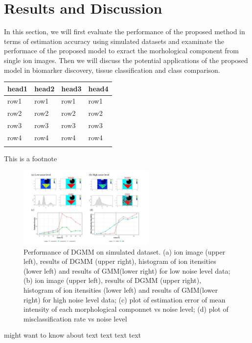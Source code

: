 \documentclass{bioinfo}
\begin{document}
\section{Results and Discussion}
In this section, we will first evaluate the performance of the proposed method in terms of estimation accuracy using simulated datasets and examinate the performace of the proposed model to exract the morhological component from single ion images. Then we will discuss the potential applications of the proposed model in biomarker discovery, tissue classification and class comparison.







\begin{table}[!t]
 {\begin{tabular}{@{}llll@{}}\toprule head1 &
head2 & head3 & head4\\\midrule
row1 & row1 & row1 & row1\\
row2 & row2 & row2 & row2\\
row3 & row3 & row3 & row3\\
row4 & row4 & row4 & row4\\\botrule
\end{tabular}}{This is a footnote}
\end{table}



\begin{figure}[b!]
    \centering
	\includegraphics[width=0.6\textwidth]{figure4.jpg}
    \caption{Performance of DGMM on simulated dataset. (a) ion image (upper left), results of DGMM (upper right), histogram of ion itensities (lower left) and results of GMM(lower right) for low noise level data; (b) ion image (upper left), results of DGMM (upper right), histogram of ion itensities (lower left) and results of GMM(lower right) for high noise level data; (c) plot of estimation error of mean intensity of each morphological componnet vs noise level; (d) plot of misclassification rate vs noise level}
    \label{fig:figure4}
\end{figure}
\citealp{Boffelli03} might want to know about text text text
text\vspace*{1pt}
\end{document}
